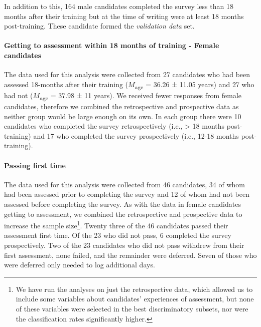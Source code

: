 \documentclass[a4paper,]{book}
\let\oldparagraph\paragraph
\renewcommand{\paragraph}[1]{\oldparagraph{#1}\mbox{}}
\begin{document}
In addition to this, 164 male candidates completed the survey less than 18 months after their training but at the time of writing were at least 18 months post-training. These candidate formed the \emph{validation data} set.

\hypertarget{getting-to-assessment-within-18-months-of-training---female-candidates}{%
\paragraph{Getting to assessment within 18 months of training - Female candidates}\label{getting-to-assessment-within-18-months-of-training---female-candidates}}

The data used for this analysis were collected from 27 candidates who had been assessed 18-months after their training (\(M\)\textsubscript{age} = 36.26 ± 11.05 years) and 27 who had not (\(M\)\textsubscript{age} = 37.98 ± 11 years). We received fewer responses from female candidates, therefore we combined the retrospective and prospective data as neither group would be large enough on its own. In each group there were 10 candidates who completed the survey retrospectively (i.e., \textgreater{} 18 months post-training) and 17 who completed the survey prospectively (i.e., 12-18 months post-training).

\hypertarget{passing-first-time}{%
\paragraph{Passing first time}\label{passing-first-time}}

The data used for this analysis were collected from 46 candidates, 34 of whom had been assessed prior to completing the survey and 12 of whom had not been assessed before completing the survey. As with the data in female candidates getting to assessment, we combined the retrospective and prospective data to increase the sample size\footnote{We have run the analyses on just the retrospective data, which allowed us to include some variables about candidates' experiences of assessment, but none of these variables were selected in the best discriminatory subsets, nor were the classification rates significantly higher.}. Twenty three of the 46 candidates passed their assessment first time. Of the 23 who did not pass, 6 completed the survey prospectively. Two of the 23 candidates who did not pass withdrew from their first assessment, none failed, and the remainder were deferred. Seven of those who were deferred only needed to log additional days.
\end{document}
